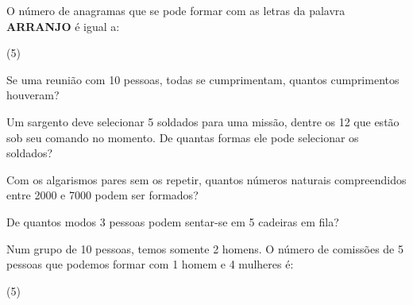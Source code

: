 \documentclass[a4paper,11pt,addpoints]{exam}
\begin{document}
\begin{questions}

	\question[1]

	O número de anagramas que se pode formar com as letras da palavra
	\textbf{ARRANJO} é igual a:

	\begin{tasks}(5)
	\end{tasks}

	\question[1]

	Se uma reunião com 10 pessoas, todas se cumprimentam, quantos cumprimentos
	houveram?

	\question[1]

	Um sargento deve selecionar 5 soldados para uma missão, dentre os 12
	que estão sob seu comando no momento. De quantas formas ele pode
	selecionar os soldados?

	\question[1]

	Com os algarismos pares sem os repetir, quantos números naturais
	compreendidos entre 2000 e 7000 podem ser formados?

	\question[1]

	De quantos modos 3 pessoas podem sentar-se em 5 cadeiras em fila?

	\question[1]

	Num grupo de 10 pessoas, temos somente 2 homens. O número de comissões de 5
	pessoas que podemos formar com 1 homem e 4 mulheres é:

	\begin{tasks}(5)

	\end{tasks}


\end{questions}
\end{document}
